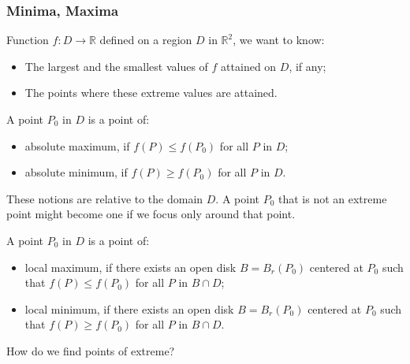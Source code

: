 \begin{frame}
  \frametitle{Minima, Maxima}

  Function $f \colon D \to \mathbb{R}$ defined on a region $D$ in $\mathbb{R}^2$, we want to know:
%
\begin{itemize}
  \item The largest and the smallest values of $f$ attained on $D$, if any;
  \item The points where these extreme values are attained.
\end{itemize}

\pause
A point $P_0$ in $D$ is a point of:
\begin{itemize}
  \item absolute maximum, if $f(P) \leqslant f(P_0)$ for all $P$ in $D$;
  \item absolute minimum, if $f(P) \geqslant f(P_0)$ for all $P$ in $D$.
\end{itemize}

\pause
These notions are relative to the domain $D$. A point $P_0$ that is not an extreme point might become one if we focus only around that point.

\pause
A point $P_0$ in $D$ is a point of:
\begin{itemize}
  \item local maximum, if there exists an open disk $B=B_r(P_0)$ centered at $P_0$ such that $f(P) \leqslant f(P_0)$ for all $P$ in $B \cap D$;
  \item local minimum, if there exists an open disk $B=B_r(P_0)$ centered at $P_0$ such that $f(P) \geqslant f(P_0)$ for all $P$ in $B \cap D$.
\end{itemize}

\pause
How do we find points of extreme?
\end{frame}